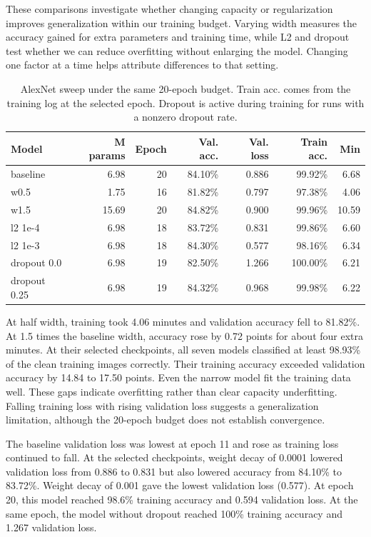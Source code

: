 \documentclass[11pt,a4paper]{article}
\begin{document}
These comparisons investigate whether changing capacity or regularization improves generalization within our training budget. Varying width measures the accuracy gained for extra parameters and training time, while L2 and dropout test whether we can reduce overfitting without enlarging the model. Changing one factor at a time helps attribute differences to that setting.

\begin{table}[htbp]\centering\small
\caption{AlexNet sweep under the same 20-epoch budget. Train acc. comes from the training log at the selected epoch. Dropout is active during training for runs with a nonzero dropout rate.}
\begin{tabular}{lrrrrrr}
\toprule
Model & M params & Epoch & Val. acc. & Val. loss & Train acc. & Min\\
\midrule
baseline & 6.98 & 20 & 84.10\% & 0.886 & 99.92\% & 6.68\\
w0.5 & 1.75 & 16 & 81.82\% & 0.797 & 97.38\% & 4.06\\
w1.5 & 15.69 & 20 & 84.82\% & 0.900 & 99.96\% & 10.59\\
l2 1e-4 & 6.98 & 18 & 83.72\% & 0.831 & 99.86\% & 6.60\\
l2 1e-3 & 6.98 & 18 & 84.30\% & 0.577 & 98.16\% & 6.34\\
dropout 0.0 & 6.98 & 19 & 82.50\% & 1.266 & 100.00\% & 6.21\\
dropout 0.25 & 6.98 & 19 & 84.32\% & 0.968 & 99.98\% & 6.22\\
\bottomrule\end{tabular}\end{table}
At half width, training took 4.06 minutes and validation accuracy fell to 81.82\%. At 1.5 times the baseline width, accuracy rose by 0.72 points for about four extra minutes. At their selected checkpoints, all seven models classified at least 98.93\% of the clean training images correctly. Their training accuracy exceeded validation accuracy by 14.84 to 17.50 points. Even the narrow model fit the training data well. These gaps indicate overfitting rather than clear capacity underfitting. Falling training loss with rising validation loss suggests a generalization limitation, although the 20-epoch budget does not establish convergence.

The baseline validation loss was lowest at epoch 11 and rose as training loss continued to fall. At the selected checkpoints, weight decay of 0.0001 lowered validation loss from 0.886 to 0.831 but also lowered accuracy from 84.10\% to 83.72\%. Weight decay of 0.001 gave the lowest validation loss (0.577). At epoch 20, this model reached 98.6\% training accuracy and 0.594 validation loss. At the same epoch, the model without dropout reached 100\% training accuracy and 1.267 validation loss.
\end{document}
